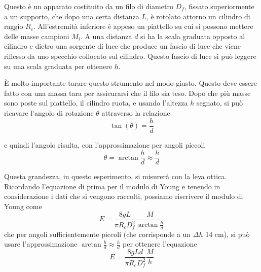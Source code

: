 \documentclass[a4paper]{article}
\begin{document}
Questo è un apparato costituito da un filo di diametro $D_f$, fissato superiormente a un supporto, che dopo una certa distanza $L$, è rotolato attorno un cilindro di raggio $R_c$. All'estremità inferiore è appeso un piattello su cui si possono mettere delle masse campioni $M_i$. A una distanza $d$ si ha la scala graduata opposto al cilindro e dietro una sorgente di luce che produce un fascio di luce che viene riflesso da uno specchio collocato sul cilindro. Questo fascio di luce si può leggere su una scala graduata per ottenere $h$. 

È molto importante tarare questo strumento nel modo giusto. Questo deve essere fatto con una massa tara per assicurarsi che il filo sia teso. Dopo che più masse sono poste sul piattello, il cilindro ruota, e usando l'altezza $h$ segnato, si può ricavare l'angolo di rotazione $\theta$ attraverso la relazione 
\begin{equation}
    \tan(\theta) = \frac{h}{d}
\end{equation}

e quindi l'angolo risulta, con l'approssimazione per angoli piccoli
\begin{equation}
    \theta = \arctan \frac{h}{d} \approx \frac{h}{d}
\end{equation}

Questa grandezza, in questo esperimento, si misurerà con la leva ottica. Ricordando l'equazione di prima per il modulo di Young e tenendo in considerazione i dati che si vengono raccolti, possiamo riscrivere il modulo di Young come 
\begin{equation}
    E = \frac{8gL}{\pi R_c D^2_f} \frac{M}{\arctan \frac{h}{d}} 
\end{equation}
che per angoli sufficientemente piccoli (che corrisponde a un $\Delta h$ 14 cm), si può usare l'approssimazione $\arctan \frac{h}{d} \approx \frac{h}{d}$ per ottenere l'equazione
\begin{equation} \label{eq7}
    E = \frac{8gLd}{\pi R_c D^2_f} \frac{M}{h} 
\end{equation}
\end{document}
